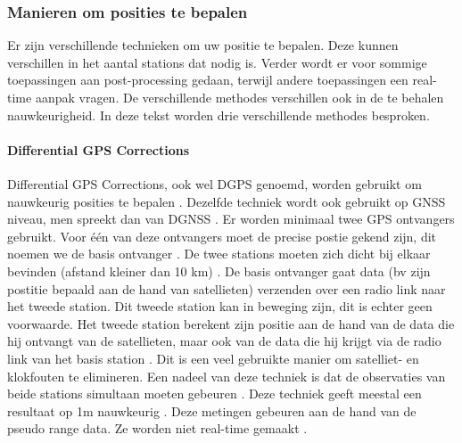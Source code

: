 \subsubsection{Manieren om posities te bepalen}
Er zijn verschillende technieken om uw positie te bepalen. Deze kunnen verschillen in het aantal stations dat nodig is. Verder wordt er voor sommige toepassingen aan post-processing gedaan, terwijl andere toepassingen een real-time aanpak vragen. De verschillende methodes verschillen ook in de te behalen nauwkeurigheid. In deze tekst worden drie verschillende methodes besproken. 

\paragraph{Differential GPS Corrections}
Differential GPS Corrections, ook wel DGPS genoemd, worden gebruikt om nauwkeurig posities  te bepalen \cite{LBibGLONASS2}. Dezelfde techniek wordt ook gebruikt op GNSS niveau, men spreekt dan van DGNSS \cite{LBibGNSS8}. Er worden minimaal twee GPS ontvangers gebruikt. Voor \'e\'en van deze ontvangers moet de precise postie gekend zijn, dit noemen we de basis ontvanger \cite{LBibGNSS2,LBibRTK}. De twee stations moeten zich dicht bij elkaar bevinden (afstand kleiner dan 10 km) \cite{LBibDGPS}. De basis ontvanger gaat data (bv zijn postitie bepaald aan de hand van satellieten) verzenden over een radio link naar het tweede station.  Dit tweede station kan in beweging zijn, dit is echter geen voorwaarde. Het tweede station berekent zijn positie aan de hand van de data die hij ontvangt van de satellieten, maar ook van de data die hij krijgt via de radio link van het basis station \cite{LBibRTK}. Dit is een veel gebruikte manier om satelliet- en klokfouten te elimineren. Een nadeel van deze techniek is dat de observaties van beide stations simultaan moeten gebeuren \cite{LBibGNSS2}. Deze techniek geeft meestal een resultaat op 1m nauwkeurig \cite{LBibRTK}. Deze metingen gebeuren aan de hand van de pseudo range data. Ze worden niet real-time gemaakt \cite{LBibRTK3}.

